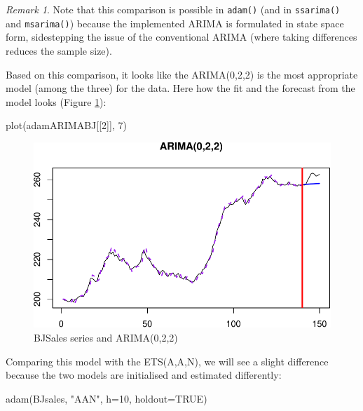 \documentclass[
]{book}
\newenvironment{Shaded}{\begin{snugshade}}{\end{snugshade}}
\newcommand{\AttributeTok}[1]{\textcolor[rgb]{0.77,0.63,0.00}{#1}}
\newcommand{\ConstantTok}[1]{\textcolor[rgb]{0.00,0.00,0.00}{#1}}
\newcommand{\DecValTok}[1]{\textcolor[rgb]{0.00,0.00,0.81}{#1}}
\newcommand{\FunctionTok}[1]{\textcolor[rgb]{0.00,0.00,0.00}{#1}}
\newcommand{\NormalTok}[1]{#1}
\newcommand{\StringTok}[1]{\textcolor[rgb]{0.31,0.60,0.02}{#1}}
\theoremstyle{definition}
\theoremstyle{definition}
\theoremstyle{definition}
\theoremstyle{definition}
\theoremstyle{remark}
\newtheorem*{remark}{Remark}
\begin{document}
\begin{remark}
Note that this comparison is possible in \texttt{adam()} (and in \texttt{ssarima()} and \texttt{msarima()}) because the implemented ARIMA is formulated in state space form, sidestepping the issue of the conventional ARIMA (where taking differences reduces the sample size).
\end{remark}

Based on this comparison, it looks like the ARIMA(0,2,2) is the most appropriate model (among the three) for the data. Here how the fit and the forecast from the model looks (Figure \ref{fig:adamARIMAPlotBJSales}):

\begin{Shaded}
\begin{Highlighting}[]
\FunctionTok{plot}\NormalTok{(adamARIMABJ[[}\DecValTok{2}\NormalTok{]], }\DecValTok{7}\NormalTok{)}
\end{Highlighting}
\end{Shaded}

\begin{figure}
\centering
\includegraphics{Svetunkov--2022----ADAM_files/figure-latex/adamARIMAPlotBJSales-1.pdf}
\caption{\label{fig:adamARIMAPlotBJSales}BJSales series and ARIMA(0,2,2)}
\end{figure}

Comparing this model with the ETS(A,A,N), we will see a slight difference because the two models are initialised and estimated differently:

\begin{Shaded}
\begin{Highlighting}[]
\FunctionTok{adam}\NormalTok{(BJsales, }\StringTok{"AAN"}\NormalTok{, }\AttributeTok{h=}\DecValTok{10}\NormalTok{, }\AttributeTok{holdout=}\ConstantTok{TRUE}\NormalTok{)}
\end{Highlighting}
\end{Shaded}
\end{document}
